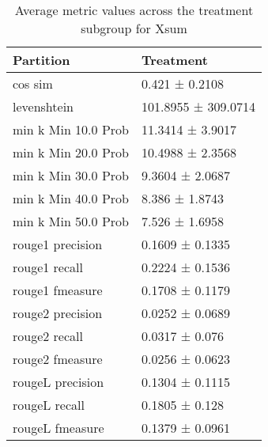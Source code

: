 \begin{table}
\caption{Average metric values across the treatment subgroup for Xsum}
\label{tab:}
\begin{tabular}{ll}
\toprule
Partition & Treatment \\
\midrule
cos sim & 0.421 ± 0.2108 \\
levenshtein & 101.8955 ± 309.0714 \\
min k Min 10.0 Prob & 11.3414 ± 3.9017 \\
min k Min 20.0 Prob & 10.4988 ± 2.3568 \\
min k Min 30.0 Prob & 9.3604 ± 2.0687 \\
min k Min 40.0 Prob & 8.386 ± 1.8743 \\
min k Min 50.0 Prob & 7.526 ± 1.6958 \\
rouge1 precision & 0.1609 ± 0.1335 \\
rouge1 recall & 0.2224 ± 0.1536 \\
rouge1 fmeasure & 0.1708 ± 0.1179 \\
rouge2 precision & 0.0252 ± 0.0689 \\
rouge2 recall & 0.0317 ± 0.076 \\
rouge2 fmeasure & 0.0256 ± 0.0623 \\
rougeL precision & 0.1304 ± 0.1115 \\
rougeL recall & 0.1805 ± 0.128 \\
rougeL fmeasure & 0.1379 ± 0.0961 \\
\bottomrule
\end{tabular}
\end{table}
